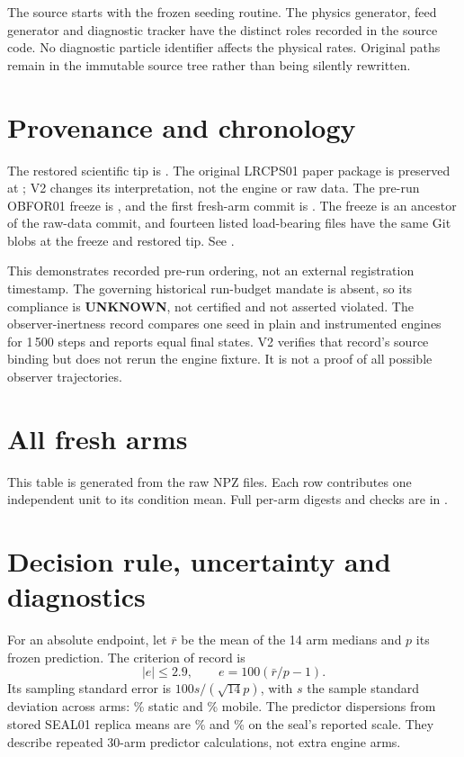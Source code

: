 \documentclass[11pt]{article}
\begin{document}
The source starts with the frozen seeding routine. The physics generator, feed generator and
diagnostic tracker have the distinct roles recorded in the source code. No diagnostic
particle identifier affects the physical rates. Original paths remain in the immutable
source tree rather than being silently rewritten.

\section{Provenance and chronology}
The restored scientific tip is
.
The original LRCPS01 paper package is preserved at ; V2 changes its interpretation,
not the engine or raw data.
The pre-run OBFOR01 freeze is
,
and the first fresh-arm commit is
.
The freeze is an ancestor of the raw-data commit, and fourteen listed load-bearing
files have the same Git blobs at the freeze and restored tip.
See .

This demonstrates recorded pre-run ordering, not an external registration timestamp.
The governing historical run-budget mandate is absent, so its compliance is
\textbf{UNKNOWN}, not certified and not asserted violated.
The observer-inertness record compares one seed in plain and instrumented engines for
1\,500 steps and reports equal final states.
V2 verifies that record's source binding but does not rerun the engine fixture.
It is not a proof of all possible observer trajectories.

\section{All fresh arms}
This table is generated from the raw NPZ files.
Each row contributes one independent unit to its condition mean.
Full per-arm digests and checks are in .
{\small}

\section{Decision rule, uncertainty and diagnostics}
For an absolute endpoint, let $\bar r$ be the mean of the 14 arm medians and $p$ its
frozen prediction. The criterion of record is
\[
 |e|\le2.9,\qquad e=100(\bar r/p-1).
\]
Its sampling standard error is $100s/(\sqrt{14}p)$, with $s$ the sample standard deviation
across arms: \VStaticSE\% static and \VMobileSE\% mobile.
The predictor dispersions from stored SEAL01 replica means are
\VStaticMCSD\% and \VMobileMCSD\% on the seal's reported scale.
They describe repeated 30-arm predictor calculations, not extra engine arms.
\end{document}
